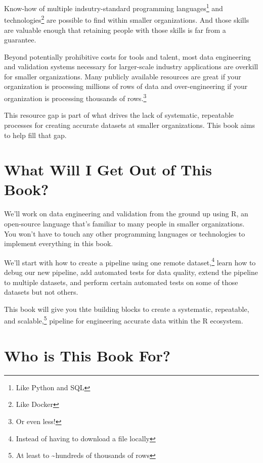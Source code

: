 \documentclass[
  letterpaper,
  DIV=11,
  numbers=noendperiod]{scrreprt}
\begin{document}
Know-how of multiple indsutry-standard programming languages\footnote{Like
  Python and SQL} and technologies\footnote{Like Docker} are possible to
find within smaller organizations. And those skills are valuable enough
that retaining people with those skills is far from a guarantee.

Beyond potentially prohibitive costs for tools and talent, most data
engineering and validation systems necessary for larger-scale industry
applications are overkill for smaller organizations. Many publicly
available resources are great if your organization is processing
millions of rows of data and over-engineering if your organization is
processing thousands of rows.\footnote{Or even less!}

This resource gap is part of what drives the lack of systematic,
repeatable processes for creating accurate datasets at smaller
organizations. This book aims to help fill that gap.

\hypertarget{what-will-i-get-out-of-this-book}{%
\section*{What Will I Get Out of This
Book?}\label{what-will-i-get-out-of-this-book}}

We'll work on data engineering and validation from the ground up using
R, an open-source language that's familiar to many people in smaller
organizations. You won't have to touch any other programming languages
or technologies to implement everything in this book.

We'll start with how to create a pipeline using one remote
dataset,\footnote{Instead of having to download a file locally} learn
how to debug our new pipeline, add automated tests for data quality,
extend the pipeline to multiple datasets, and perform certain automated
tests on some of those datasets but not others.

This book will give you thte building blocks to create a systematic,
repeatable, and scalable,\footnote{At least to \textasciitilde hundreds
  of thousands of rows} pipeline for engineering accurate data within
the R ecosystem.

\hypertarget{who-is-this-book-for}{%
\section*{Who is This Book For?}\label{who-is-this-book-for}}
\end{document}
